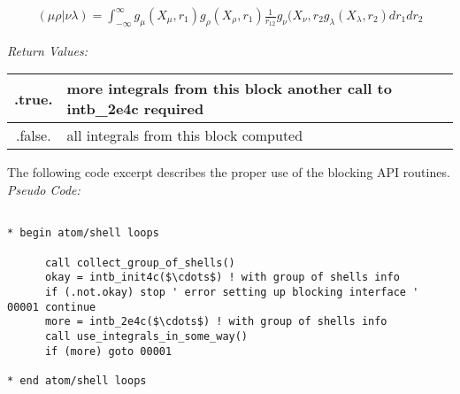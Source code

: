 \begin{eqnarray*} 
({\mu}{\rho}|{\nu}{\lambda}) = \int_{-\infty}^{\infty} g_{\mu}(X_{\mu},r_{1})g_{\rho}(X_{\rho},r_{1})\frac{1}{r_{12}}g_{\nu}
(X_{\nu},r_{2}g_{\lambda}(X_{\lambda},r_{2})dr_{1}dr_{2} 
\end{eqnarray*} 
 
{\it Return Values:} 
\begin{tabular}{|c|p{60mm}|} \hline 
 .true.  & more integrals from this block another call to intb\_2e4c required \\ \hline 
 .false. & all integrals from this block computed\\ \hline 
\end{tabular} 
 
The following code excerpt describes the proper use of the blocking 
API routines.\\ 
{\it Pseudo Code:} 
\begin{verbatim} 
 
* begin atom/shell loops 
 
      call collect_group_of_shells() 
      okay = intb_init4c($\cdots$) ! with group of shells info      
      if (.not.okay) stop ' error setting up blocking interface ' 
00001 continue 
      more = intb_2e4c($\cdots$) ! with group of shells info 
      call use_integrals_in_some_way() 
      if (more) goto 00001 
 
* end atom/shell loops 
 
\end{verbatim} 
 

